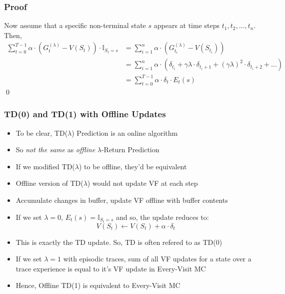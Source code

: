 \documentclass[handout]{beamer}
\begin{document}
\begin{frame}
\frametitle{Proof}
\pause
Now assume that a specific non-terminal state $s$ appears at time steps $t_1, t_2, \ldots, t_n$. Then,
\pause
\begin{align*}
\sum_{t=0}^{T-1} \alpha \cdot (G_t^{(\lambda)} - V(S_t)) \cdot \mathbb{I}_{S_t=s} & = \sum_{i=1}^n \alpha \cdot (G_{t_i}^{(\lambda)} - V(S_{t_i})) \\
& = \sum_{i=1}^n \alpha \cdot (\delta_{t_i} + \gamma \lambda \cdot \delta_{t_i+1} + (\gamma \lambda)^2 \cdot \delta_{t_i+2} + \ldots ) \\
& = \sum_{t=0}^{T-1} \alpha \cdot \delta_t \cdot E_t(s)
\end{align*}
\qed
\end{frame}


\begin{frame}
\frametitle{TD(0) and TD(1) with Offline Updates}
\pause
\begin{itemize}[<+->]
\item To be clear, TD($\lambda$) Prediction is an online algorithm
\item So {\em not the same} as {\em offline} $\lambda$-Return Prediction
\item If we modified TD($\lambda$) to be offline, they'd be equivalent
\item Offline version of TD($\lambda$) would not update VF at each step
\item Accumulate changes in buffer, update VF offline with buffer contents
\item If we set $\lambda = 0$, $E_t(s) = \mathbb{I}_{S_t=s}$ and so, the update reduces to:
$$V(S_t) \leftarrow V(S_t) + \alpha \cdot \delta_t$$
\item This is exactly the TD update. So, TD is often refered to as TD(0)
\item If we set $\lambda=1$ with episodic traces, sum of all VF updates for a state over a trace experience is equal to it's VF update in Every-Visit MC
\item Hence, Offline TD(1) is equivalent to Every-Visit MC
\end{itemize}
\end{frame}
\end{document}
